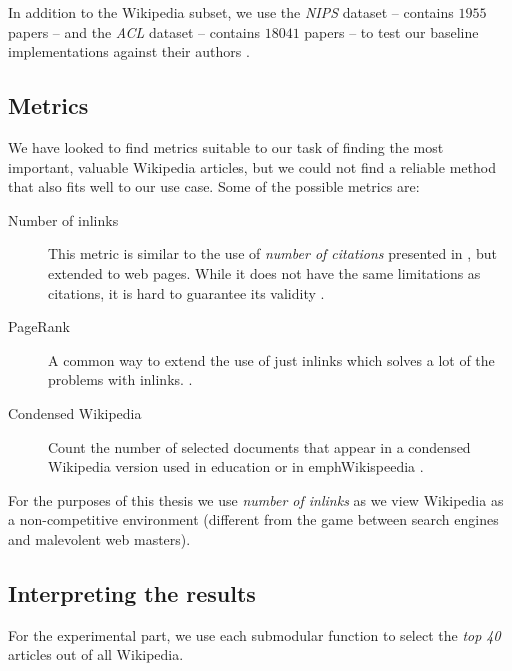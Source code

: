 In addition to the Wikipedia subset, we use the \emph{\acf{NIPS}} dataset --
contains \(1955\) papers -- and the \emph{\acf{ACL}} dataset -- contains
\(18041\) papers -- to test our baseline implementations against their authors
\cite{sipos2012temporal}.

\subsection{Metrics}

We have looked to find metrics suitable to our task of finding the most
important, valuable Wikipedia articles, but we could not find a reliable method
that also fits well to our use case.
Some of the possible metrics are:
\begin{description}
  \item[Number of inlinks] This metric is similar to the use of \emph{number of
  citations} presented in \cite{sipos2012temporal}, but extended to web pages.
  While it does not have the same limitations as citations, it is hard to
  guarantee its validity .
  \item[PageRank] A common way to extend the use of just inlinks which solves a
  lot of the problems with inlinks.
  .
  \item[Condensed Wikipedia] Count the number of selected documents that appear
  in a condensed Wikipedia version used in education or in emph{Wikispeedia}
  .
\end{description}

For the purposes of this thesis we use \emph{number of inlinks} as we view
Wikipedia as a non-competitive environment (different from the game between
search engines and malevolent web masters).

\subsection{Interpreting the results}

For the experimental part, we use each submodular function to select the
\emph{top 40} articles out of all Wikipedia.

